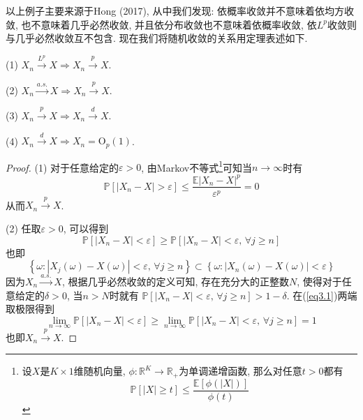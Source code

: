 \documentclass[cn, 12pt, math=mtpro2, bibstyle=apa, blue, twocol]{elegantbook}
\newcommand{\R}{\mathbb{R}}
\newcommand{\E}{\mathbb{E}}
\newcommand{\PP}{\mathbb{P}}
\newcommand{\limn}{\lim_{n\to\infty}}
\begin{document}
以上例子主要来源于Hong (2017), 从中我们发现: 依概率收敛并不意味着依均方收敛, 也不意味着几乎必然收敛, 并且依分布收敛也不意味着依概率收敛, 依$L^p$收敛则与几乎必然收敛互不包含. 现在我们将随机收敛的关系用定理表述如下.
\begin{theorem}\label{thm:thm3.1}
  (1) $X_n\xrightarrow{L^p}X\Rightarrow X_n\xrightarrow{p}X$.

  (2) $X_n\xrightarrow{a.s.}X\Rightarrow X_n\xrightarrow{p}X$.

  (3) $X_n\xrightarrow{p}X\Rightarrow X_n\xrightarrow{d}X$.

  (4) $X_n\xrightarrow{d}X\Rightarrow X_n=\text{O}_p(1)$.
\end{theorem}
\begin{proof}
  (1) 对于任意给定的$\varepsilon>0$, 由Markov不等式\footnote{设$X$是$K\times1$维随机向量, $\phi:\R^K\to\R_+$为单调递增函数, 那么对任意$t>0$都有$$\PP[|X|\geq t]\leq \frac{\E[\phi(|X|)]}{\phi(t)}$$}可知当$n\to\infty$时有
  $$\PP[|X_n-X|>\varepsilon]\leq\frac{\E|X_n-X|^p}{\varepsilon^p}=0$$
  从而$X_n\xrightarrow{p}X$.

  (2) 任取$\varepsilon>0$, 可以得到
  \begin{equation}\label{eq3.1}
    \PP[|X_n-X|<\varepsilon]\geq \PP[|X_n-X|<\varepsilon,\,\forall j\geq n]
  \end{equation}
  也即
  $$\left\{\omega: |X_j(\omega)-X(\omega)|<\varepsilon,\,\forall j\geq n\right\}\subset\left\{\omega: |X_n(\omega)-X(\omega)|<\varepsilon\right\}$$
  因为$X_n\xrightarrow{a.s.}X$, 根据几乎必然收敛的定义可知, 存在充分大的正整数$N$, 使得对于任意给定的$\delta>0$, 当$n>N$时就有
  $\PP[|X_n-X|<\varepsilon,\,\forall j\geq n]>1-\delta$. 在(\ref{eq3.1})两端取极限得到
  $$\limn \PP[|X_n-X|<\varepsilon]\geq \limn \PP[|X_n-X|<\varepsilon,\,\forall j\geq n]=1$$
  也即$X_n\xrightarrow{p}X$.


\end{proof}
\end{document}
